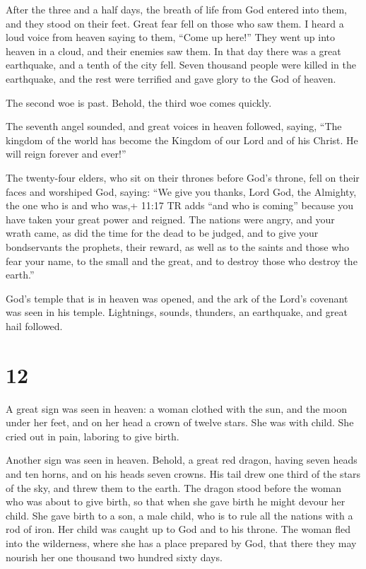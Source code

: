  After the three and a half days, the breath of life from
God entered into them, and they stood on their feet. Great fear fell on
those who saw them.  I heard a loud voice from heaven
saying to them, ``Come up here!'' They went up into heaven in a cloud,
and their enemies saw them.  In that day there was a great
earthquake, and a tenth of the city fell. Seven thousand people were
killed in the earthquake, and the rest were terrified and gave glory to
the God of heaven.

 The second woe is past. Behold, the third woe comes
quickly.

 The seventh angel sounded, and great voices in heaven
followed, saying, ``The kingdom of the world has become the Kingdom of
our Lord and of his Christ. He will reign forever and ever!''

 The twenty-four elders, who sit on their thrones before
God's throne, fell on their faces and worshiped God, 
saying: ``We give you thanks, Lord God, the Almighty, the one who is and
who was,+ 11:17 TR adds ``and who is coming'' because you have taken
your great power and reigned.  The nations were angry, and
your wrath came, as did the time for the dead to be judged, and to give
your bondservants the prophets, their reward, as well as to the saints
and those who fear your name, to the small and the great, and to destroy
those who destroy the earth.''

 God's temple that is in heaven was opened, and the ark of
the Lord's covenant was seen in his temple. Lightnings, sounds,
thunders, an earthquake, and great hail followed.

\hypertarget{section-11}{%
\section{12}\label{section-11}}

 A great sign was seen in heaven: a woman clothed with the
sun, and the moon under her feet, and on her head a crown of twelve
stars.  She was with child. She cried out in pain, laboring
to give birth.

 Another sign was seen in heaven. Behold, a great red
dragon, having seven heads and ten horns, and on his heads seven crowns.
 His tail drew one third of the stars of the sky, and threw
them to the earth. The dragon stood before the woman who was about to
give birth, so that when she gave birth he might devour her child.
 She gave birth to a son, a male child, who is to rule all
the nations with a rod of iron. Her child was caught up to God and to
his throne.  The woman fled into the wilderness, where she
has a place prepared by God, that there they may nourish her one
thousand two hundred sixty days.

